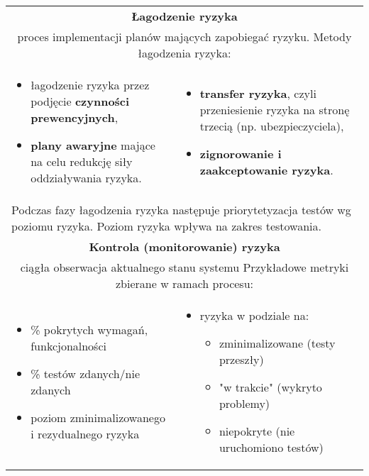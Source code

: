 \documentclass[../main.tex]{subfiles}
\begin{document}
\begin{table}[H]
\begin{center}
\begin{tabular}{| p{8cm}  p{8cm} |}
                \hline
                \hline
                \multicolumn{2}{|c|}{\textbf{Łagodzenie ryzyka}} \\
                \multicolumn{2}{|c|}{proces implementacji planów mających zapobiegać ryzyku. Metody łagodzenia ryzyka:} \\
                \hline
                \begin{itemize}
                    \item łagodzenie ryzyka przez podjęcie \textbf{czynności prewencyjnych},
                    \item \textbf{plany awaryjne} mające na celu redukcję siły oddziaływania ryzyka.
                \end{itemize}
                &
                \begin{itemize}
                    \item \textbf{transfer ryzyka}, czyli przeniesienie ryzyka na stronę trzecią (np. ubezpieczyciela),
                    \item \textbf{zignorowanie i zaakceptowanie ryzyka}.
                \end{itemize} \\
                \multicolumn{2}{|p{16cm}|}{Podczas fazy łagodzenia ryzyka następuje priorytetyzacja testów wg poziomu ryzyka. Poziom ryzyka wpływa na zakres testowania.} \\
                \hline
                \hline
                \multicolumn{2}{|c|}{\textbf{Kontrola (monitorowanie) ryzyka}} \\
                \multicolumn{2}{|c|}{ciągła obserwacja aktualnego stanu systemu Przykładowe metryki zbierane w ramach procesu:} \\
                \hline
                \begin{itemize}
                    \item \% pokrytych wymagań, funkcjonalności
                    \item \% testów zdanych/nie zdanych
                    \item poziom zminimalizowanego i rezydualnego ryzyka
                \end{itemize}
                &
                \begin{itemize}
                    \item ryzyka w podziale na:
                    \begin{itemize}
                        \item zminimalizowane (testy przeszły)
                        \item "w trakcie" (wykryto problemy)
                        \item niepokryte (nie uruchomiono testów)
                    \end{itemize}
                \end{itemize} \\
                \hline
            \end{tabular}
        \end{center}
    \end{table}
\end{document}
